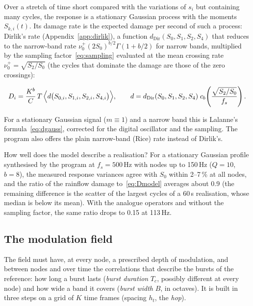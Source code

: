 Over a stretch of time short compared with the variations of $s_i$ but containing many cycles, the
response is a stationary Gaussian process with the moments $S_{k,i}(t)$. Its damage rate is the
expected damage per second of such a process: Dirlik's rate (Appendix~\ref{app:dirlik}), a function
$d_{\mathrm{Dir}}(S_0,S_1,S_2,S_4)$ that reduces to the narrow-band rate $\nu_0^+(2S_0)^{b/2}
\Gamma(1+b/2)$ for narrow bands, multiplied by the sampling factor~\eqref{eq:sampling} evaluated at
the mean crossing rate $\nu_0^+ = \sqrt{S_2/S_0}$ (the cycles that dominate the damage are those of
the zero crossings):
\begin{result}
\begin{equation}\label{eq:Dmodel}
  D_i = \frac{K^b}{C}\,T\,\Bigl\langle d\bigl(S_{0,i},S_{1,i},S_{2,i},S_{4,i}\bigr)\Bigr\rangle ,
  \qquad
  d = d_{\mathrm{Dir}}(S_0,S_1,S_2,S_4)\;c_b\!\left(\frac{\sqrt{S_2/S_0}}{f_s}\right).
\end{equation}
\end{result}
For a stationary Gaussian signal ($m\equiv1$) and a narrow band this is Lalanne's
formula~\eqref{eq:dgauss}, corrected for the digital oscillator and the sampling. The program also
offers the plain narrow-band (Rice) rate instead of Dirlik's.

How well does the model describe a realisation? For a stationary Gaussian profile synthesised by the
program at $f_s = 500$\,Hz with nodes up to 150\,Hz ($Q=10$, $b=8$), the measured response variances
agree with $S_0$ within 2--7\,\% at all nodes, and the ratio of the rainflow damage to~\eqref{eq:Dmodel}
averages about 0.9 (the remaining difference is the scatter of the largest cycles of a 60\,s
realisation, whose median is below its mean). With the analogue operators and without the sampling
factor, the same ratio drops to 0.15 at 113\,Hz.

\subsection{The modulation field}\label{sec:field}

The field must have, at every node, a prescribed depth of modulation, and between nodes and over time
the correlations that describe the bursts of the reference: how long a burst lasts (\emph{burst
duration} $T_c$, possibly different at every node) and how wide a band it covers (\emph{burst width}
$B$, in octaves). It is built in three steps on a grid of $K$ time frames (spacing $h_t$, the
\emph{hop}).

